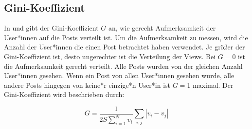 \subsection{Gini-Koeffizient}

In \cite{Lerman2014} und \cite{Salganik2006854} gibt der Gini-Koeffizient $G$ an, wie gerecht Aufmerksamkeit der User*innen auf die Posts verteilt ist.
Um die Aufmerksamkeit zu messen, wird die Anzahl der User*innen die einen Post betrachtet haben verwendet. Je größer der Gini-Koeffizient ist, desto ungerechter ist die Verteilung der Views. 
Bei $G = 0$ ist die Aufmerksamkeit gerecht verteilt. Alle Posts wurden von der gleichen Anzahl User*innen gesehen. Wenn ein Post von allen User*innen gesehen wurde, alle andere Posts hingegen von keine*r einzige*n User*in ist $G = 1$ maximal. Der Gini-Koeffizient wird beschrieben durch:

\begin{equation}
G = \frac{1}{2S\sum_{i = 1}^{N}v_{i}}\sum_{i,j}|v_{i} - v_{j} |
\end{equation}





